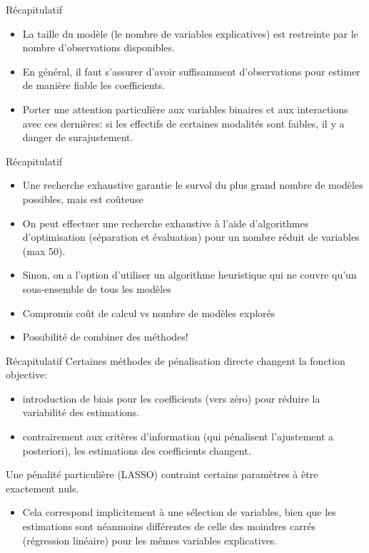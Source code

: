 \documentclass[
  ignorenonframetext,
]{beamer}
\providecommand{\tightlist}{%
  \setlength{\itemsep}{0pt}\setlength{\parskip}{0pt}}
\begin{document}
\begin{frame}{Récapitulatif}
\protect{}\label{ruxe9capitulatif-1}
\begin{itemize}
\tightlist
\item
  La taille du modèle (le nombre de variables explicatives) est
  restreinte par le nombre d'observations disponibles.
\item
  En général, il faut s'assurer d'avoir suffisamment d'observations pour
  estimer de manière fiable les coefficients.
\item
  Porter une attention particulière aux variables binaires et aux
  interactions avec ces dernières: si les effectifs de certaines
  modalités sont faibles, il y a danger de surajustement.
\end{itemize}
\end{frame}

\begin{frame}{Récapitulatif}
\protect{}\label{ruxe9capitulatif-2}
\begin{itemize}
\tightlist
\item
  Une recherche exhaustive garantie le survol du plus grand nombre de
  modèles possibles, mais est coûteuse
\item
  On peut effectuer une recherche exhaustive à l'aide d'algorithmes
  d'optimisation (séparation et évaluation) pour un nombre réduit de
  variables (max 50).
\item
  Sinon, on a l'option d'utiliser un algorithme heuristique qui ne
  couvre qu'un sous-ensemble de tous les modèles
\item
  Compromis coût de calcul vs nombre de modèles explorés
\item
  Possibilité de combiner des méthodes!
\end{itemize}
\end{frame}

\begin{frame}{Récapitulatif}
\protect{}\label{ruxe9capitulatif-3}
Certaines méthodes de pénalisation directe changent la fonction
objective:

\begin{itemize}
\tightlist
\item
  introduction de biais pour les coefficients (vers zéro) pour réduire
  la variabilité des estimations.
\item
  contrairement aux critères d'information (qui pénalisent l'ajustement
  a posteriori), les estimations des coefficients changent.
\end{itemize}

Une pénalité particulière (LASSO) contraint certains paramètres à être
exactement nuls.

\begin{itemize}
\tightlist
\item
  Cela correspond implicitement à une sélection de variables, bien que
  les estimations sont néanmoins différentes de celle des moindres
  carrés (régression linéaire) pour les mêmes variables explicatives.
\end{itemize}
\end{frame}
\end{document}
